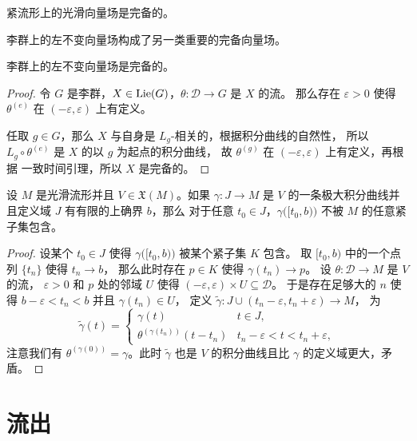 \begin{corollary}
  紧流形上的光滑向量场是完备的。
\end{corollary}

李群上的左不变向量场构成了另一类重要的完备向量场。

\begin{theorem}
  李群上的左不变向量场是完备的。
\end{theorem}
\begin{proof}
  令 $G$ 是李群，$X\in\operatorname{Lie}(G)$，$\theta:\mathcal{D}\to G$ 是 $X$ 的流。
  那么存在 $\varepsilon>0$ 使得 $\theta^{(e)}$ 在 $(-\varepsilon,\varepsilon)$ 上有定义。

  任取 $g\in G$，那么 $X$ 与自身是 $L_g$-相关的，根据积分曲线的自然性，
  所以 $L_g\circ \theta^{(e)}$ 是 $X$ 的以 $g$ 为起点的积分曲线，
  故 $\theta^{(g)}$ 在 $(-\varepsilon,\varepsilon)$ 上有定义，再根据
  一致时间引理，所以 $X$ 是完备的。
\end{proof}

\begin{lemma}[逃脱引理]
  设 $M$ 是光滑流形并且 $V\in \mathfrak{X}(M)$。如果 $\gamma:J\to M$
  是 $V$ 的一条极大积分曲线并且定义域 $J$ 有有限的上确界 $b$，那么
  对于任意 $t_0\in J$，$\gamma\bigl([t_0,b)\bigr)$ 不被 $M$
  的任意紧子集包含。
\end{lemma}
\begin{proof}
  设某个 $t_0\in J$ 使得 $\gamma\bigl([t_0,b)\bigr)$ 被某个紧子集 $K$ 包含。
  取 $[t_0,b)$ 中的一个点列 $\{t_n\}$ 使得 $t_n\to b$，
  那么此时存在 $p\in K$ 使得 $\gamma(t_n)\to p$。
  设 $\theta: \mathcal{D}\to M$ 是 $V$ 的流， $\varepsilon>0$ 和 $p$
  处的邻域 $U$ 使得 $(-\varepsilon,\varepsilon)\times U\subseteq \mathcal{D}$。
  于是存在足够大的 $n$ 使得 $b-\varepsilon<t_n<b$ 并且 $\gamma(t_n)\in U$，
  定义 $\tilde{\gamma}:J\cup (t_n-\varepsilon,t_n+\varepsilon)\to M$，
  为
  \[
    \tilde{\gamma}(t)=\begin{cases}
      \gamma(t) & t\in J,\\
      \theta^{(\gamma(t_n))}(t-t_n) & t_n-\varepsilon<t<t_n+\varepsilon,
    \end{cases}
  \]
  注意我们有 $\theta^{(\gamma(0))}=\gamma$。此时 $\tilde \gamma$ 也是 $V$
  的积分曲线且比 $\gamma$ 的定义域更大，矛盾。  
\end{proof}

\section{流出}


